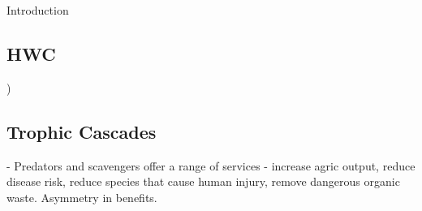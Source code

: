 Introduction

\subsection{HWC}

\subsubsectionHerbivores

\subsubsectionCarnivores)

\subsection{Trophic Cascades}

\cite{O_Bryan_2018} - Predators and scavengers offer a range of services - increase agric output, reduce disease risk, reduce species that cause human injury, remove dangerous organic waste. Asymmetry in benefits.


